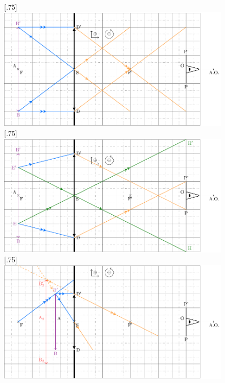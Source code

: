 \documentclass[a4paper, 10pt, garamond, oneside]{book}
\begin{document}
{	\begin{figure}[htbp!]
		\centering
		[.75\linewidth]
		{\includegraphics[width=\linewidth]{P1_1-corr}}
		[.75\linewidth]
		{\includegraphics[width=\linewidth]{P1_2-corr}}
		[.75\linewidth]
		{\includegraphics[width=\linewidth]{P1_3-corr}}
		\caption{}
		\label{fig:gobs_corr}
	\end{figure}
}
\vspace{-20pt}
\end{document}
